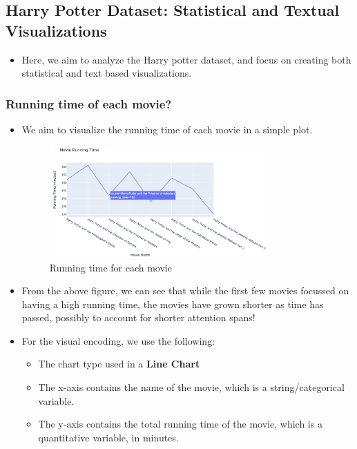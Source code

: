 \documentclass[a4paper]{article}
\begin{document}
\subsection{Harry Potter Dataset: Statistical and Textual Visualizations}
\begin{itemize}
    \item Here, we aim to analyze the Harry potter dataset, and focus on creating both statistical and text based visualizations.
\end{itemize}
\subsubsection{Running time of each movie?}
\begin{itemize}
    \item We aim to visualize the running time of each movie in a simple plot.
    \begin{figure}[H]
        \centering
        \includegraphics[width=0.8\textwidth]{running_time}
        \caption{Running time for each movie}
        \label{fig:running_time}
    \end{figure}
    \item From the above figure, we can see that while the first few movies focussed on having a high running time, the movies have grown shorter as time has passed, possibly to account for shorter attention spans!
    \item For the visual encoding, we use the following:
    \begin{itemize}
        \item The chart type used in a \textbf{Line Chart}  
        \item The x-axis contains the name of the movie, which is a string/categorical variable.
        \item The y-axis contains the total running time of the movie, which is a quantitative variable, in minutes.
    \end{itemize}
\end{itemize}
\end{document}
